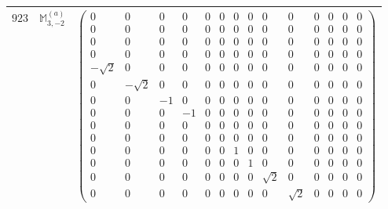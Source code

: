 \documentclass[fleqn,8pt,landscape]{jsarticle}
\begin{document}
\begin{center}
\begin{longtable}{ccc}
$ 923 $ & $ \mathbb{M}_{3,-2}^{(a)} $ & $ \begin{pmatrix} 0 & 0 & 0 & 0 & 0 & 0 & 0 & 0 & 0 & 0 & 0 & 0 & 0 & 0 \\ 0 & 0 & 0 & 0 & 0 & 0 & 0 & 0 & 0 & 0 & 0 & 0 & 0 & 0 \\ 0 & 0 & 0 & 0 & 0 & 0 & 0 & 0 & 0 & 0 & 0 & 0 & 0 & 0 \\ 0 & 0 & 0 & 0 & 0 & 0 & 0 & 0 & 0 & 0 & 0 & 0 & 0 & 0 \\ - \sqrt{2} & 0 & 0 & 0 & 0 & 0 & 0 & 0 & 0 & 0 & 0 & 0 & 0 & 0 \\ 0 & - \sqrt{2} & 0 & 0 & 0 & 0 & 0 & 0 & 0 & 0 & 0 & 0 & 0 & 0 \\ 0 & 0 & -1 & 0 & 0 & 0 & 0 & 0 & 0 & 0 & 0 & 0 & 0 & 0 \\ 0 & 0 & 0 & -1 & 0 & 0 & 0 & 0 & 0 & 0 & 0 & 0 & 0 & 0 \\ 0 & 0 & 0 & 0 & 0 & 0 & 0 & 0 & 0 & 0 & 0 & 0 & 0 & 0 \\ 0 & 0 & 0 & 0 & 0 & 0 & 0 & 0 & 0 & 0 & 0 & 0 & 0 & 0 \\ 0 & 0 & 0 & 0 & 0 & 0 & 1 & 0 & 0 & 0 & 0 & 0 & 0 & 0 \\ 0 & 0 & 0 & 0 & 0 & 0 & 0 & 1 & 0 & 0 & 0 & 0 & 0 & 0 \\ 0 & 0 & 0 & 0 & 0 & 0 & 0 & 0 & \sqrt{2} & 0 & 0 & 0 & 0 & 0 \\ 0 & 0 & 0 & 0 & 0 & 0 & 0 & 0 & 0 & \sqrt{2} & 0 & 0 & 0 & 0 \end{pmatrix} $ \\ \hline

\end{longtable}
\end{center}
\end{document}
